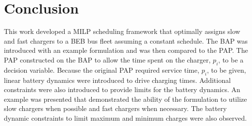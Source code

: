 \documentclass[letterpaper, 10pt, conference]{IEEEtran}
\begin{document}
\section{Conclusion}
\label{sec:conclusion}
This work developed a MILP scheduling framework that optimally assigns slow and fast chargers to a BEB bus fleet assuming a constant schedule. The BAP was introduced with an example formulation and was then compared to the PAP. The PAP constructed on the BAP to allow the time spent on the charger, $p_i$, to be a decision variable. Because the original PAP required service time, $p_i$, to be given, linear battery dynamics were introduced to drive charging times. Additional constraints were also introduced to provide limits for the battery dynamics. An example was presented that demonstrated the ability of the formulation to utilize slow chargers when possible and fast chargers when necessary. The battery dynamic constraints to limit maximum and minimum charges were also observed.




\end{document}
